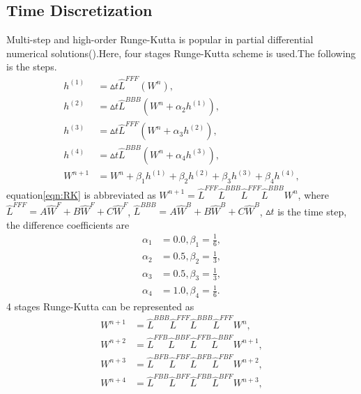 \subsection{Time Discretization} 
Multi-step and high-order Runge-Kutta is popular in partial differential numerical solutions(\cite{hu1996low,Zhang2012three}).Here, four stages Runge-Kutta scheme is used.The following is the steps.
\begin{subequations}
\begin{align}
	h^{(1)} &= \vartriangle t \hat{L}^{FFF}(W^{n}), \\
	h^{(2)} &= \vartriangle t \hat{L}^{BBB}(W^{n} + \alpha_{2} h^{(1)}), \\
	h^{(3)} &= \vartriangle t \hat{L}^{FFF}(W^{n} + \alpha_{3} h^{(2)}), \\
	h^{(4)} &= \vartriangle t \hat{L}^{BBB}(W^{n} + \alpha_{4} h^{(3)}), \\
	W^{n+1} &= W^{n} + \beta_{1} h^{(1)}+ \beta_{2} h^{(2)}+ \beta_{3} h^{(3)}+ \beta_{4} h^{(4)}, 
\end{align}\label{eqn:RK}
\end{subequations}
equation\ref{eqn:RK} is abbreviated as $W^{n+1} = \hat{L}^{FFF} \hat{L}^{BBB} \hat{L}^{FFF} \hat{L}^{BBB} W^{n}$, where $\hat{L}^{FFF} = A\hat{W}^{F}+B\hat{W}^{F}+C\hat{W}^{F}$, $\hat{L}^{BBB} = A\hat{W}^{B}+B\hat{W}^{B}+C\hat{W}^{B}$, $\vartriangle t$ is the time step, the difference coefficients are
\begin{subequations}
\begin{align}
	\alpha_{1} &= 0.0, \beta_{1} = \frac{1}{6}, \\
	\alpha_{2} &= 0.5, \beta_{2} = \frac{1}{3}, \\
	\alpha_{3} &= 0.5, \beta_{3} = \frac{1}{3}, \\
	\alpha_{4} &= 1.0, \beta_{4} = \frac{1}{6}. 
\end{align}
\end{subequations}
4 stages Runge-Kutta can be represented as
\begin{subequations}
	\begin{align}
		W^{n+1} &= \hat{L}^{BBB} \hat{L}^{FFF} \hat{L}^{BBB} \hat{L}^{FFF} W^{n}, \\
		W^{n+2} &= \hat{L}^{FFB} \hat{L}^{BBF} \hat{L}^{FFB} \hat{L}^{BBF} W^{n+1}, \\
		W^{n+3} &= \hat{L}^{BFB} \hat{L}^{FBF} \hat{L}^{BFB} \hat{L}^{FBF} W^{n+2}, \\
		W^{n+4} &= \hat{L}^{FBB} \hat{L}^{BFF} \hat{L}^{FBB} \hat{L}^{BFF} W^{n+3}, 
	\end{align}
\end{subequations}
